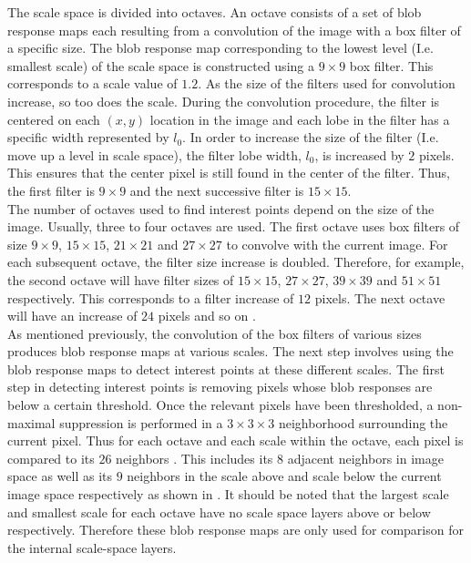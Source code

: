 \documentclass[11pt]{report}
\begin{document}
The scale space is divided into octaves. An octave consists of a set of blob response maps each resulting from a convolution of the image with a box filter of a specific size. The blob response map corresponding to the lowest level (I.e. smallest scale) of the scale space is constructed using a $9 \times 9$ box filter. This corresponds to a scale value of $1.2$. As the size of the filters used for convolution increase, so too does the scale. During the convolution procedure, the filter is centered on each $(x,y)$ location in the image and each lobe in the filter has a specific width represented by $l_0$. In order to increase the size of the filter (I.e. move up a level in scale space), the filter lobe width, $l_0$, is increased by $2$ pixels. This ensures that the center pixel is still found in the center of the filter. Thus, the first filter is $9 \times 9$ and the next successive filter is $15 \times 15$. \\

The number of octaves used to find interest points depend on the size of the image. Usually, three to four octaves are used. The first octave uses box filters of size $9 \times 9$, $15 \times 15$, $21 \times 21$ and $27 \times 27$ to convolve with the current image.  For each subsequent octave, the filter size increase is doubled. Therefore, for example, the second octave will have filter sizes of $15 \times 15$, $27 \times 27$, $39 \times 39$ and $51 \times 51$ respectively. This corresponds to a filter increase of $12$ pixels. The next octave will have an increase of $24$ pixels and so on \cite{Bay2008}. \\

As mentioned previously, the convolution of the box filters of various sizes produces blob response maps at various scales. The next step involves using the blob response maps to detect interest points at these different scales. The first step in detecting interest points is removing pixels whose blob responses are below a certain threshold. Once the relevant pixels have been thresholded,  a non-maximal suppression is performed in a $3 \times 3 \times 3$ neighborhood surrounding the current pixel. Thus for each octave and each scale within the octave, each pixel is compared to its $26$ neighbors \cite{Evans2009}. This includes its $8$ adjacent neighbors in image space as well as its $9$ neighbors in the scale above and scale below the current image space respectively as shown in  \cite{Lowe2004}. It should be noted that the largest scale and smallest scale for each octave have no scale space layers above or below respectively. Therefore these blob response maps are only used for comparison for the internal scale-space layers. \\
\end{document}
